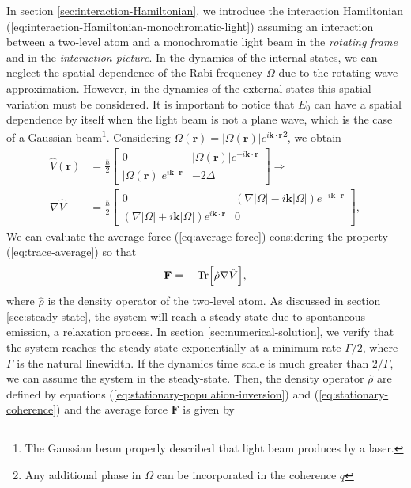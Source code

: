 {In section \ref{sec:interaction-Hamiltonian}, we introduce the interaction Hamiltonian (\ref{eq:interaction-Hamiltonian-monochromatic-light}) assuming an interaction between a two-level atom and a monochromatic light beam in the \textit{rotating frame} and in the \textit{interaction picture}. In the dynamics of the internal states, we can neglect the spatial dependence of the Rabi frequency $ \Omega $ due to the rotating wave approximation. However, in the dynamics of the external states this spatial variation must be considered. It is important to notice that $ E_0 $ can have a spatial dependence by itself when the light beam is not a plane wave, which is the case of a Gaussian beam\footnote{The Gaussian beam properly described that light beam produces by a laser.}. Considering $ \Omega(\mathbf{r}) = |\Omega(\mathbf{r})| e^{i\mathbf{k}\cdot\mathbf{r}} $\footnote{Any additional phase in $ \Omega $ can be incorporated in the coherence $ q $}, we obtain
\begin{align}
	\hat{V}(\mathbf{r}) &= \frac{\hbar}{2}\left[ \begin{matrix} 0 & |\Omega(\mathbf{r})| e^{-i\mathbf{k}\cdot\mathbf{r}} \\ |\Omega(\mathbf{r})| e^{i\mathbf{k}\cdot\mathbf{r}} & -2\Delta \end{matrix} \right] \Rightarrow \\
	\nabla \hat{V} &= \frac{\hbar}{2}\left[ \begin{matrix} 0 & (\nabla|\Omega| - i\mathbf{k}|\Omega|)e^{-i\mathbf{k}\cdot\mathbf{r}} \\ (\nabla|\Omega| + i\mathbf{k}|\Omega|) e^{i\mathbf{k}\cdot\mathbf{r}} & 0 \end{matrix} \right],
\end{align}
We can evaluate the average force (\ref{eq:average-force}) considering the property (\ref{eq:trace-average}) so that
\begin{equation}
	\mathbf{F} = -\Tr[\hat{\rho}\nabla\hat{V}],
\end{equation}
where $ \hat{\rho} $ is the density operator of the two-level atom. As discussed in section \ref{sec:steady-state}, the system will reach a steady-state due to spontaneous emission, a relaxation process. In section \ref{sec:numerical-solution}, we verify that the system reaches the steady-state exponentially at a minimum rate $ \Gamma / 2 $, where $ \Gamma $ is the natural linewidth. If the dynamics time scale is much greater than $ 2 / \Gamma $, we can assume the system in the steady-state. Then, the density operator $ \hat{\rho} $ are defined by equations (\ref{eq:stationary-population-inversion}) and (\ref{eq:stationary-coherence}) and the average force $ \mathbf{F} $ is given by
}
